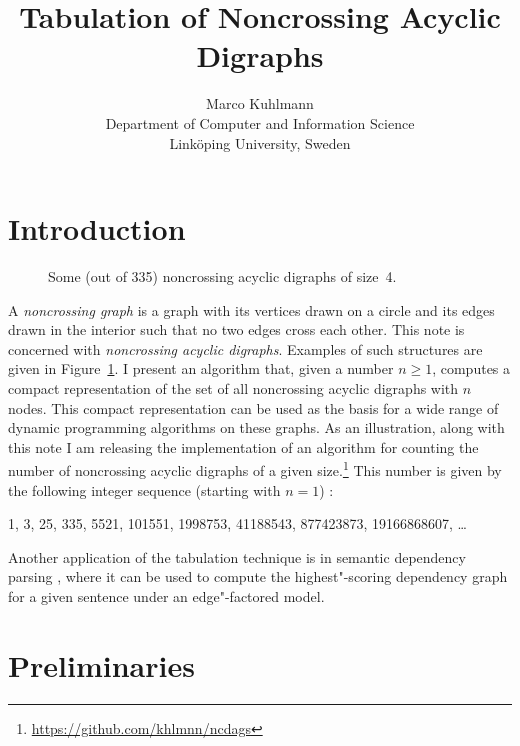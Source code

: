 \documentclass[a4paper]{article}
\begin{document}
\title{Tabulation of Noncrossing Acyclic Digraphs}

\author{%
	Marco Kuhlmann\\
	Department of Computer and Information Science\\
	Linköping University, Sweden}

\maketitle


\section{Introduction}

\begin{figure}
	\centering\footnotesize
	
	\caption{Some (out of 335) noncrossing acyclic digraphs of size~4.}
	\label{fig:ncdags-examples}
\end{figure}

A \emph{noncrossing graph} is a graph with its vertices drawn on a circle and its edges drawn in the interior such that no two edges cross each other.
This note is concerned with \emph{noncrossing acyclic digraphs}.
Examples of such structures are given in Figure~\ref{fig:ncdags-examples}.
I present an algorithm that, given a number $n \geq 1$, computes a compact representation of the set of all noncrossing acyclic digraphs with $n$ nodes.
This compact representation can be used as the basis for a wide range of dynamic programming algorithms on these graphs.
As an illustration, along with this note I am releasing the implementation of an algorithm for counting the number of noncrossing acyclic digraphs of a given size.\footnote{\url{https://github.com/khlmnn/ncdags}}
This number is given by the following integer sequence (starting with $n = 1$) \citep{tirrell2014number}:
\begin{center}
	1, 3, 25, 335, 5521, 101551, 1998753, 41188543, 877423873, 19166868607, \dots
\end{center}
Another application of the tabulation technique is in semantic dependency parsing \citep{oepen2014broad}, where it can be used to compute the highest"-scoring dependency graph for a given sentence under an edge"-factored model.


\section{Preliminaries}
\end{document}
